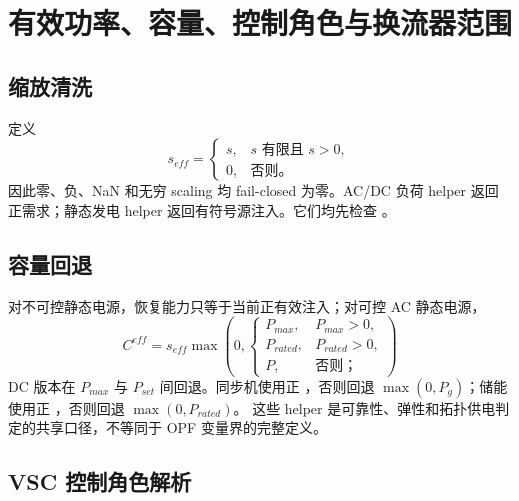 \section{有效功率、容量、控制角色与换流器范围}

\subsection{缩放清洗}

 定义
\begin{equation}
s_{eff}=\begin{cases}s,&s\text{ 有限且 }s>0,\\0,&\text{否则。}\end{cases}
\end{equation}
因此零、负、NaN 和无穷 scaling 均 fail-closed 为零。AC/DC 负荷 helper 返回正需求；静态发电 helper
返回有符号源注入。它们均先检查 。

\subsection{容量回退}

对不可控静态电源，恢复能力只等于当前正有效注入；对可控 AC 静态电源，
\begin{equation}
C^{eff}=s_{eff}\max\left(0,
\begin{cases}P_{max},&P_{max}>0,\\P_{rated},&P_{rated}>0,\\P,&\text{否则；}\end{cases}\right)
\end{equation}
DC 版本在 $P_{max}$ 与 $P_{set}$ 间回退。同步机使用正 ，否则回退
$\max(0,P_g)$；储能使用正 ，否则回退 $\max(0,P_{rated})$。
这些 helper 是可靠性、弹性和拓扑供电判定的共享口径，不等同于 OPF 变量界的完整定义。

\subsection{VSC 控制角色解析}

